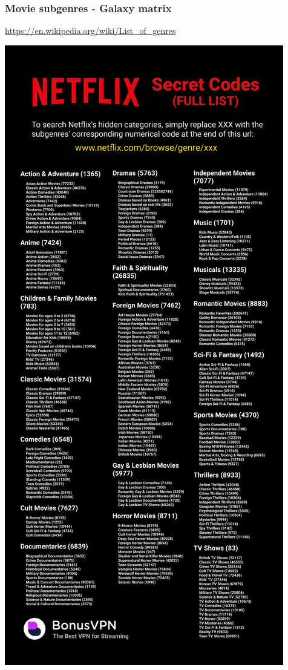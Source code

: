 \begin{frame}
    \frametitle{Movie subgenres - Galaxy matrix}
    \url{https://en.wikipedia.org/wiki/List_of_genres}
    \begin{center}
        \includegraphics[scale=0.12]{pics/movie-subgenre}
    \end{center}
\end{frame}

